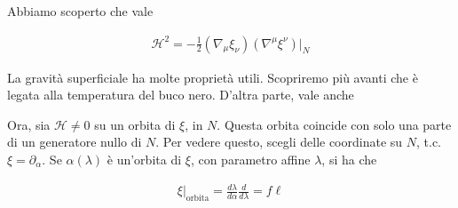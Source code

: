 \documentclass{report}
\begin{document}
Abbiamo scoperto che vale 

\begin{align}
    \mathcal{H}^2 = -\frac{1}{2}(\nabla_\mu\xi_\nu)(\nabla^\mu\xi^\nu)|_{N}
\end{align}

La gravità superficiale ha molte proprietà utili. Scopriremo più avanti che è legata alla temperatura del buco nero. D'altra parte, vale anche 

  


Ora, sia \(\mathcal{H} \neq 0\) su un orbita di \(\xi\), in \(N\). Questa orbita coincide con solo una parte di un generatore nullo di \(N\). Per vedere questo, scegli delle coordinate su \(N\), t.c. \(\xi = \partial_\alpha\). Se \(\alpha(\lambda)\) è un'orbita di \(\xi\), con parametro affine \(\lambda\), si ha che 

\begin{align}
    \xi|_{\text{orbita}} = \frac{d\lambda}{d\alpha}\frac{d}{d\lambda} = f\ell
\end{align}
\end{document}
